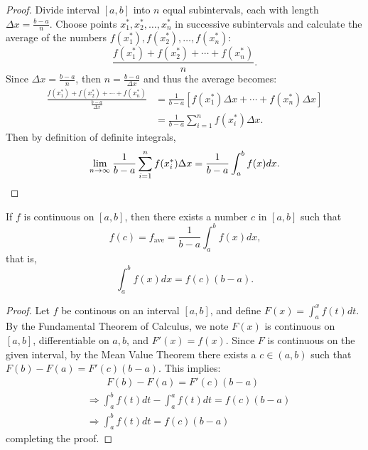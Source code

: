 \documentclass[a4paper,11pt]{article}
\begin{document}
\begin{outline}
    \begin{proof}
      Divide interval \([a, b]\) into \(n\) equal subintervals, each with length \(\Delta x = \frac{b-a}{n}\). 
      Choose points \(x_1^*, x_2^*, \ldots, x_n^*\) in successive subintervals and calculate the average of the numbers
      \(f(x_1^*), f(x_2^*), \ldots, f(x_n^*)\): \[ \frac{f(x_1^*) + f(x_2^*) + \cdots + f(x_n^*)}{n}\text{.} \]
      Since \(\Delta x = \frac{b-a}{n}\), then \(n = \frac{b-a}{\Delta x}\) and thus the average becomes:
      \begin{align*}
        \frac{f(x_1^*) + f(x_2^*) + \cdots + f(x_n^*)}{\frac{b-a}{\Delta x}} &= 
          \frac{1}{b-a}\left[f(x_1^*)\Delta x + \cdots + f(x_n^*)\Delta x\right] \\
          &= \frac{1}{b-a}\sum_{i=1}^n f(x_i^*)\Delta x\text{.}
      \end{align*}
      Then by definition of definite integrals, 
      \[
        \lim\limits_{n\rightarrow \infty^{}}\frac{1}{b-a}\sum_{i=1}^n f(x_i^*)\Delta x = \frac{1}{b-a}\int_a^b f(x)dx\text{.}
      \]
    \end{proof}
    
    If \(f\) is continuous on \([a, b]\), then there exists a number \(c\) in \([a, b]\) such that
    \[ f(c) = f_{\text{ave}} = \frac{1}{b-a}\int_a^b f(x)dx\text{,} \] that is, \[ \int_a^b f(x)dx = 
    f(c)(b-a)\text{.} \]
    
    \begin{proof}
      Let \(f\) be continous on an interval \([a, b]\), and define \(F(x) = \int_a^x f(t)dt\). By the 
      Fundamental Theorem of Calculus, we note \(F(x)\) is continuous on \([a, b]\), differentiable on
      \(a, b\), and \(F'(x) = f(x)\). Since \(F\) is continuous on the given interval, by the Mean Value Theorem
      there exists a \(c \in (a, b)\) such that \(F(b) - F(a) = F'(c)(b - a)\). This implies:
      \begin{align*}
        & \qquad F(b) - F(a) = F'(c)(b - a) \\
        &\Rightarrow \int_a^b f(t)dt - \int_a^a f(t)dt = f(c)(b-a) \\
        &\Rightarrow \int_a^b f(t)dt = f(c)(b-a)
      \end{align*}
      completing the proof.
    \end{proof}

\end{outline}
\end{document}
